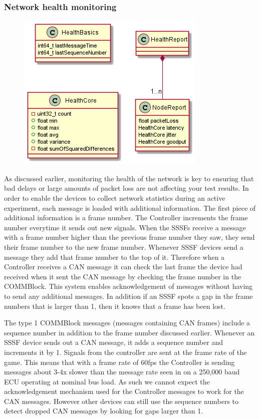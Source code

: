 \documentclass[letterpaper,twocolumn,12pt]{article}
\begin{document}
\subsubsection{Network health monitoring}
\begin{figure}[t!]
    \centering
    \includegraphics[width=\linewidth]{out/images/network_health/network_health.png}
    \caption{}
    \label{fig:}
\end{figure}
As discussed earlier, monitoring the health of the network is key to ensuring that bad delays or large amounts of packet loss are not affecting your test results. In order to enable the devices to collect network statistics during an active experiment, each message is loaded with additional information. The first piece of additional information is a frame number. The Controller increments the frame number everytime it sends out new signals. When the SSSFs receive a message with a frame number higher than the previous frame number they saw, they send their frame number to the new frame number. Whenever SSSF devices send a message they add that frame number to the top of it. Therefore when a Controller receives a CAN message it can check the last frame the device had received when it sent the CAN message by checking the frame number in the COMMBlock. This system enables acknowledgement of messages without having to send any additional messages. In addition if an SSSF spots a gap in the frame numbers that is larger than 1, then it knows that a frame has been lost.

The type 1 COMMBlock messages (messages containing CAN frames) include a sequence number in addition to the frame number discussed earlier. Whenever an SSSF device sends out a CAN message, it adds a sequence number and increments it by 1. Signals from the controller are sent at the frame rate of the game. This means that with a frame rate of 60fps the Controller is sending messages about 3-4x slower than the message rate seen in on a 250,000 baud ECU operating at nominal bus load. As such we cannot expect the acknowledgement mechanism used for the Controller messages to work for the CAN messages. However other devices can still use the sequence numbers to detect dropped CAN messages by looking for gaps larger than 1.
\end{document}
